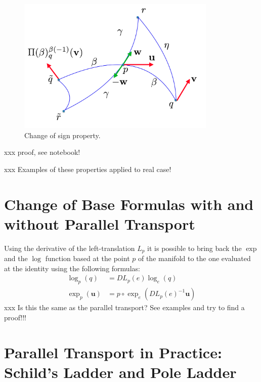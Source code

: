 \begin{figure}[htbp]
	\centering
	\includegraphics[width=9.5cm]{figures/sign_1.png}
	\caption{Change of sign property.}
	\label{fig:sign_propr}
\end{figure}


\noindent
xxx proof, see notebook!

\noindent
xxx Examples of these properties applied to real case!

\section{Change of Base Formulas with and without Parallel Transport}
Using the derivative of the left-translation $L_{p}$ it is possible to bring back the $\exp$ and the $\log$ function based at the point $p$ of the manifold to the one evaluated at the identity using the following formulas:
\begin{align*}
	\log _{p}(q)  &= DL_{p}(e) \log _{e}(q)  \\
	\exp _{p}(\mathbf{u})  &= p\circ \exp_{e} (DL_{p}(e)^{-1} \mathbf{u})
\end{align*}
xxx Is this the same as the parallel transport? See examples and try to find a proof!!!


\section{Parallel Transport in Practice: Schild's Ladder and Pole Ladder}




